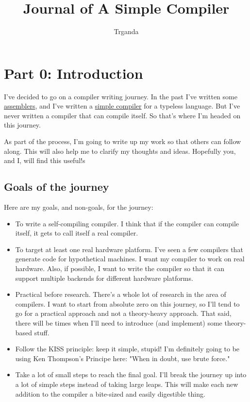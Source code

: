 \documentclass[journal, onecolumn, 12pt]{IEEEtran}
\title{Journal of A Simple Compiler}
\author{Trganda}
\begin{document}
\maketitle

\section{Part 0: Introduction}

I've decided to go on a compiler writing journey.
In the past I've written some \href{https://github.com/DoctorWkt/pdp7-unix/blob/master/tools/as7}{assemblers},
and I've written a \href{https://github.com/DoctorWkt/h-compiler}{simple compiler} for a typeless language.
But I've never written a compiler that can compile itself.
So that's where I'm headed on this journey.

As part of the process, I'm going to write up my work so that others can follow along.
This will also help me to clarify my thoughts and ideas. Hopefully you, and I, will find this useful!s

\subsection{Goals of the journey}

Here are my goals, and non-goals, for the journey:

\begin{itemize}
    \item To write a self-compiling compiler. I think that if the compiler can compile itself, it gets to call itself a real compiler.
    \item To target at least one real hardware platform. I've seen a few compilers that generate code for hypothetical machines.
          I want my compiler to work on real hardware. Also, if possible, I want to write the compiler so that it can support multiple backends for different hardware platforms.
    \item Practical before research. There's a whole lot of research in the area of compilers. I want to start from absolute zero on this journey, so I'll tend to go for a practical approach and not a theory-heavy approach. That said, there will be times when I'll need to introduce (and implement) some theory-based stuff.
    \item Follow the KISS principle: keep it simple, stupid! I'm definitely going to be using Ken Thompson's Principe here: "When in doubt, use brute force."
    \item Take a lot of small steps to reach the final goal. I'll break the journey up into a lot of simple steps instead of taking large leaps. This will make each new addition to the compiler a bite-sized and easily digestible thing.
\end{itemize}
\end{document}
